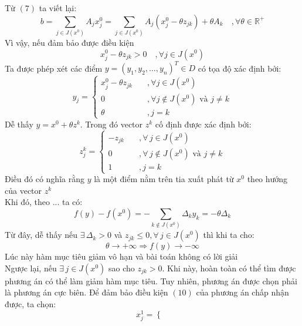 \documentclass[12pt,a4paper]{article}\author{Nguyễn Nho Dũng}
\newcommand{\ngoacto}[1]{\left(#1\right)}
\newcommand{\tong}[1]{\sum_{#1}}
\newcommand{\vectordong}[1]{\ngoacto{#1_1, #1_2, \ldots, #1_n}^T}
\begin{document}
\begin{cm}
	Từ $(7)$ ta viết lại:
	\begin{equation}
		b = \tong{j\in J(x^0)} A_jx^0_j = \tong{j\in J(x^0)} A_j\ngoacto{x^0_j - \theta z_{jk}} + \theta A_k\quad, \forall \theta\in\mathbb{R}^+
	\end{equation}
	Vì vậy, nếu đảm bảo được điều kiện
	\begin{equation}
		x^0_j - \theta z_{jk} > 0 \quad, \forall j\in J(x^0)
	\end{equation}
	Ta được phép xét các điểm $y=\vectordong{y}\in D$ có tọa độ xác định bởi:
	\begin{equation*}
		y_j = \left\{\begin{array}{cl}
			x^0_j - \theta z_{jk} &\quad, \forall j\in J(x^0)\\
			0 &\quad, \forall j\notin J(x^0) \text{ và } j\neq k\\
			\theta &\quad, j=k
		\end{array}\right.
	\end{equation*}
	Dễ thấy $y = x^0 + \theta z^k$. Trong đó vector $z^k$ cố định được xác định bởi:
	\begin{equation*}
		z^k_j = \left\{\begin{array}{cl}
			-z_{jk} &\quad, \forall\, j\in J(x^0)\\
			0 &\quad, \forall\, j\notin J(x^0) \text{ và } j\neq k\\
			1 &\quad, j=k
		\end{array}\right.
	\end{equation*}
	Điều đó có nghĩa rằng $y$ là một điểm nằm trên tia xuất phát từ $x^0$ theo hướng của vector $z^k$\\
	Khi đó, theo ... ta có:
	\begin{equation}
		f(y) - f(x^0) = -\tong{k\notin J(x^0)} \Delta_k y_k = -\theta\Delta_k
	\end{equation}
	Từ đây, dễ thấy nếu $\exists\, \Delta_k > 0$ và $z_{jk} \le 0, \forall\, j\in J(x^0)$ thì khi ta cho: $$\theta \rightarrow +\infty \Rightarrow f(y) \rightarrow -\infty$$
	Lúc này hàm mục tiêu giảm vô hạn và bài toán không có lời giải\\
	Ngược lại, nếu $\exists\, j\in J(x^0)$ sao cho $z_{jk} > 0$. Khi này, hoàn toàn có thể tìm được phương án có thể làm giảm hàm mục tiêu. Tuy nhiên, phương án được chọn phải là phương án cực biên. Để đảm bảo điều kiện $(10)$ của phương án chấp nhận được, ta chọn:
	\begin{equation*}
		x^1_j = \left\{\begin{array}{cl}

\end{array}
\end{equation*}
\end{cm}
\end{document}
